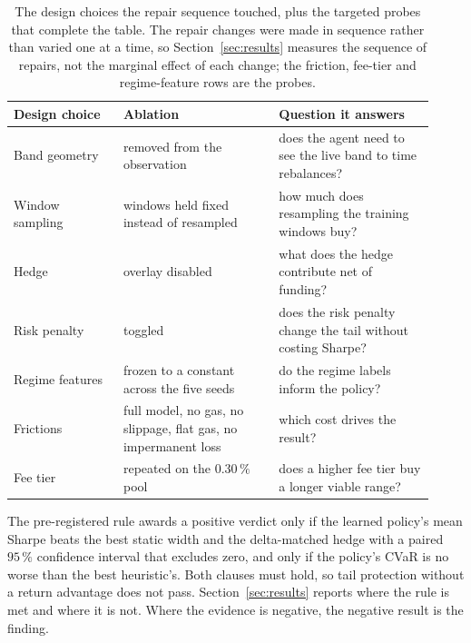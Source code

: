 \begin{table}[tbp]
\caption{The design choices the repair sequence touched, plus the targeted
probes that complete the table. The repair changes were made in sequence rather
than varied one at a time, so Section~\ref{sec:results} measures the sequence
of repairs, not the marginal effect of each change; the friction, fee-tier and
regime-feature rows are the probes.}
\label{tab:ablations}
\centering
\small
\begin{tabular}{@{}L{0.24\linewidth}L{0.34\linewidth}L{0.34\linewidth}@{}}
\toprule
\textbf{Design choice} & \textbf{Ablation} & \textbf{Question it answers} \\
\midrule
Band geometry & removed from the observation & does the agent need to see the live band to time rebalances? \\
Window sampling & windows held fixed instead of resampled & how much does resampling the training windows buy? \\
Hedge & overlay disabled & what does the hedge contribute net of funding? \\
Risk penalty & toggled & does the risk penalty change the tail without costing Sharpe? \\
Regime features & frozen to a constant across the five seeds & do the regime labels inform the policy? \\
Frictions & full model, no gas, no slippage, flat gas, no impermanent loss & which cost drives the result? \\
Fee tier & repeated on the $0.30\,\%$ pool & does a higher fee tier buy a longer viable range? \\
\bottomrule
\end{tabular}
\end{table}

The pre-registered rule awards a positive verdict only if the learned policy's
mean Sharpe beats the best static width and the delta-matched hedge with a
paired $95\,\%$ confidence interval that excludes zero, and only if the
policy's CVaR is no worse than the best heuristic's. Both clauses must hold,
so tail protection without a return advantage does not pass.
Section~\ref{sec:results} reports where the rule is met and where it is not.
Where the evidence is negative, the negative result is the finding.
